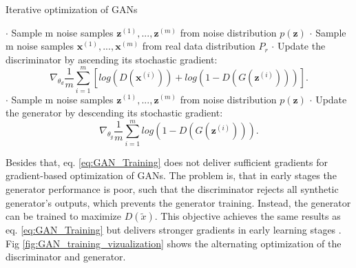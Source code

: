 \begin{algorithm}
\caption{Iterative optimization of GANs}\label{alg:cap}
\begin{algorithmic}
        \State $\cdot$ Sample m noise samples ${\pmb{z}^{(1)}, . . . , \pmb{z}^{(m)}}$ from noise distribution $p(\pmb{z})$
        \State $\cdot$ Sample m noise samples ${\pmb{x}^{(1)}, . . . , \pmb{x}^{(m)}}$ from real data distribution $P_{r}$
        \State $\cdot$ Update the discriminator by ascending its stochastic gradient:
        \begin{equation*}
            \nabla_{\theta_{d}} \frac{1}{m} \sum_{i=1}^{m} [log(D(\pmb{x}^{(i)})) + log(1-D(G(\pmb{z}^{(i)})))].
        \end{equation*}
    \EndWhile
    \State $\cdot$ Sample m noise samples ${\pmb{z}^{(1)}, . . . , \pmb{z}^{(m)}}$ from noise distribution $p(\pmb{z})$
    \State $\cdot$ Update the generator by descending its stochastic gradient:
    \begin{equation*}
        \nabla_{\theta_{g}} \frac{1}{m} \sum_{i=1}^{m} log(1-D(G(\pmb{z}^{(i)}))).
    \end{equation*}
\EndWhile
\label{alg.GAN_optimization}
\end{algorithmic}
\end{algorithm}

Besides that, eq. \ref{eq:GAN_Training} does not deliver sufficient gradients for gradient-based optimization of GANs. The problem is, that in early stages the generator performance is poor, such that the discriminator rejects all synthetic generator's outputs, which prevents the generator training. Instead, the generator can be trained to maximize $D(\tilde{x})$. This objective achieves the same results as eq. \ref{eq:GAN_Training} but delivers stronger gradients in early learning stages \cite{Goodfellow2014}. Fig \ref{fig:GAN_training_vizualization} shows the alternating optimization of the discriminator and generator. 

